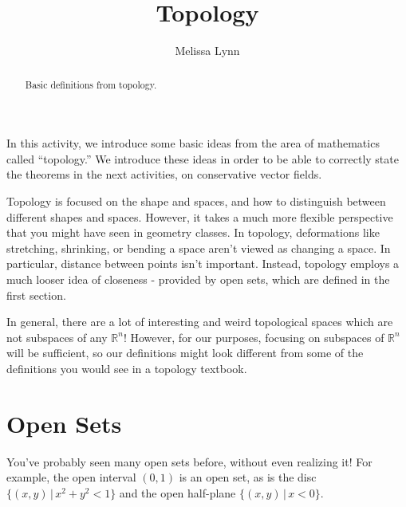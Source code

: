 \documentclass{ximera}
\title{Topology}
\author{Melissa Lynn}
\begin{document}
  
\begin{abstract}  
Basic definitions from topology.
\end{abstract}  
\maketitle

In this activity, we introduce some basic ideas from the area of mathematics called ``topology.'' We introduce these ideas in order to be able to correctly state the theorems in the next activities, on conservative vector fields.

Topology is focused on the shape and spaces, and how to distinguish between different shapes and spaces. However, it takes a much more flexible perspective that you might have seen in geometry classes. In topology, deformations like stretching, shrinking, or bending a space aren't viewed as changing a space. In particular, distance between points isn't important. Instead, topology employs a much looser idea of closeness - provided by open sets, which are defined in the first section.

In general, there are a lot of interesting and weird topological spaces which are not subspaces of any $\mathbb{R}^n$! However, for our purposes, focusing on subspaces of $\mathbb{R}^n$ will be sufficient, so our definitions might look different from some of the definitions you would see in a topology textbook. 

\section{Open Sets}

You've probably seen many open sets before, without even realizing it! For example, the open interval $(0,1)$ is an open set, as is the disc $\{(x,y)\,|\,x^2+y^2<1\}$ and the open half-plane $\{(x,y)\,|\,x<0\}$.
\end{document}
